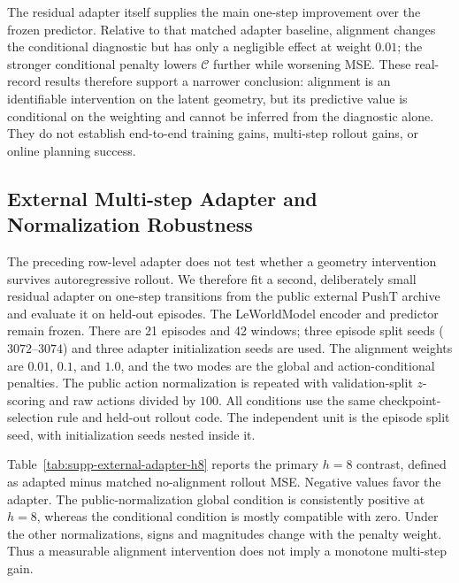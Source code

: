 \documentclass{article}
\begin{document}
The residual adapter itself supplies the main one-step improvement over the
frozen predictor. Relative to that matched adapter baseline, alignment changes
the conditional diagnostic but has only a negligible effect at weight $0.01$;
the stronger conditional penalty lowers $\mathcal C$ further while worsening
MSE. These real-record results therefore support a narrower conclusion:
alignment is an identifiable intervention on the latent geometry, but its
predictive value is conditional on the weighting and cannot be inferred from
the diagnostic alone. They do not establish end-to-end training gains,
multi-step rollout gains, or online planning success.

\subsection{External Multi-step Adapter and Normalization Robustness}
\label{sec:supp-external-adapter-robustness}

The preceding row-level adapter does not test whether a geometry intervention
survives autoregressive rollout. We therefore fit a second, deliberately small
residual adapter on one-step transitions from the public external PushT
archive and evaluate it on held-out episodes. The LeWorldModel encoder and
predictor remain frozen. There are 21 episodes and 42 windows; three episode
split seeds ($3072$--$3074$) and three adapter initialization seeds are used.
The alignment weights are $0.01$, $0.1$, and $1.0$, and the two modes are the
global and action-conditional penalties. The public action normalization is
repeated with validation-split $z$-scoring and raw actions divided by $100$.
All conditions use the same checkpoint-selection rule and held-out rollout
code. The independent unit is the episode split seed, with initialization
seeds nested inside it.

Table~\ref{tab:supp-external-adapter-h8} reports the primary $h=8$ contrast,
defined as adapted minus matched no-alignment rollout MSE. Negative values
favor the adapter. The public-normalization global condition is consistently
positive at $h=8$, whereas the conditional condition is mostly compatible
with zero. Under the other normalizations, signs and magnitudes change with
the penalty weight. Thus a measurable alignment intervention does not imply a
monotone multi-step gain.
\end{document}
